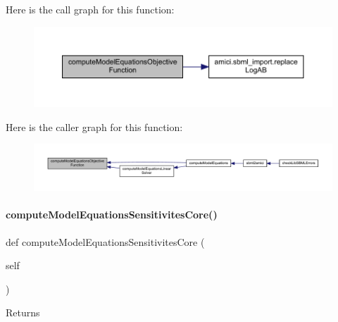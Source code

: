 Here is the call graph for this function\+:
\nopagebreak
\begin{figure}[H]
\begin{center}
\leavevmode
\includegraphics[width=350pt]{classamici_1_1sbml__import_1_1_sbml_importer_a0912a62ab201e0bb9b4ecb5c42894398_cgraph}
\end{center}
\end{figure}
Here is the caller graph for this function\+:
\nopagebreak
\begin{figure}[H]
\begin{center}
\leavevmode
\includegraphics[width=350pt]{classamici_1_1sbml__import_1_1_sbml_importer_a0912a62ab201e0bb9b4ecb5c42894398_icgraph}
\end{center}
\end{figure}
\mbox{\label{classamici_1_1sbml__import_1_1_sbml_importer_a1f587cc58599d48e31ce68804357b142}} 
\paragraph{\texorpdfstring{compute\+Model\+Equations\+Sensitivites\+Core()}{computeModelEquationsSensitivitesCore()}}
{\footnotesize\ttfamily def compute\+Model\+Equations\+Sensitivites\+Core (\begin{DoxyParamCaption}\item[{}]{self }\end{DoxyParamCaption})}

\begin{DoxyReturn}{Returns}

\end{DoxyReturn}


